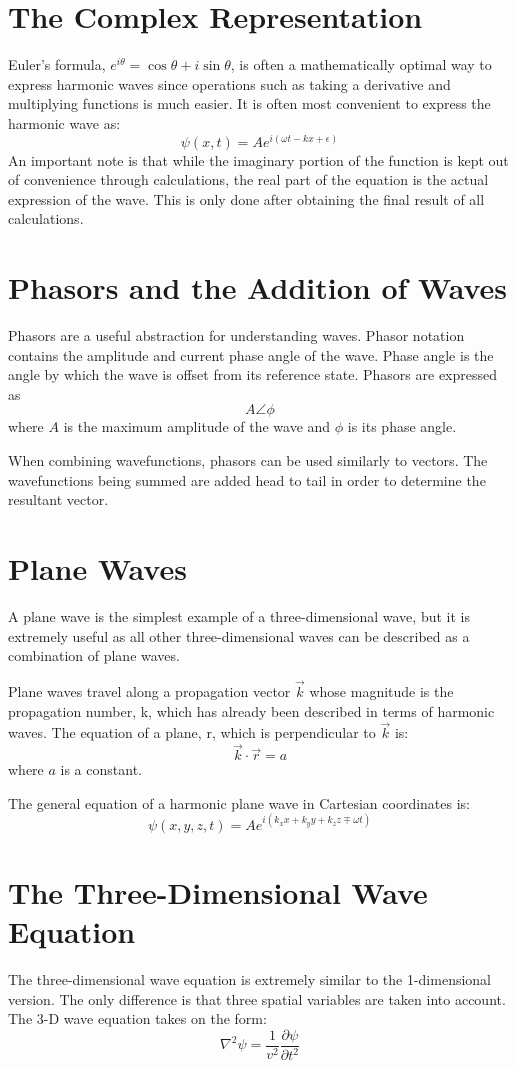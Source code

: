 \documentclass[12pt]{report}
\begin{document}
\section{The Complex Representation}
Euler's formula, $e^{i\theta} = \cos\theta+i\sin\theta$, is often a mathematically optimal way to express harmonic waves since operations such as taking a derivative and multiplying functions is much easier. It is often most convenient to express the harmonic wave as:
\begin{equation}
\psi(x,t) = Ae^{i(\omega t -kx+\epsilon)}
\end{equation}
An important note is that while the imaginary portion of the function is kept out of convenience through calculations, the real part of the equation is the actual expression of the wave. This is only done after obtaining the final result of all calculations.
\section{Phasors and the Addition of Waves}
Phasors are a useful abstraction for understanding waves. Phasor notation contains the amplitude and current phase angle of the wave. Phase angle is the angle by which the wave is offset from its reference state. Phasors are expressed as $$A\angle \phi $$ where $A$ is the maximum amplitude of the wave and $\phi$ is its phase angle. 

When combining wavefunctions, phasors can be used similarly to vectors. The wavefunctions being summed are added head to tail in order to determine the resultant vector. 

\section{Plane Waves}
A plane wave is the simplest example of a three-dimensional wave, but it is extremely useful as all other three-dimensional waves can be described as a combination of plane waves.

Plane waves travel along a propagation vector $\vec{k}$ whose magnitude is the propagation number, k, which has already been described in terms of harmonic waves. The equation of a plane, r, which is perpendicular to $\vec{k}$ is:
\[\vec{k}\cdot\vec{r} = a\] where $a$ is a constant. 

The general equation of a harmonic plane wave in Cartesian coordinates is:
\[\psi(x,y,z,t) = Ae^{i(k_xx+k_yy+k_zz \mp \omega t)}\]

\section{The Three-Dimensional Wave Equation}
The three-dimensional wave equation is extremely similar to the 1-dimensional version. The only difference is that three spatial variables are taken into account. The 3-D wave equation takes on the form:
\begin{equation}
\nabla^2 \psi = \frac{1}{v^2}\frac{\partial\psi}{\partial t^2}
\end{equation}
\end{document}
